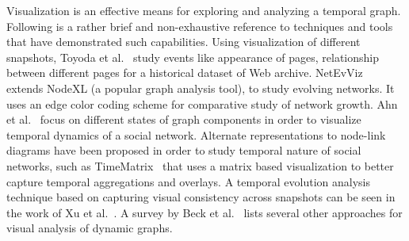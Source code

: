 \documentclass{svjour3}
\begin{document}
Visualization is an effective means for exploring and analyzing a temporal graph. Following is a rather brief and non-exhaustive reference to techniques and tools that have demonstrated such capabilities. 
Using visualization of different snapshots, Toyoda et al.~\cite{toyoda2005system} study events like appearance of pages, relationship between different pages for a historical dataset of Web archive.
NetEvViz~\cite{khurana2011visual} extends NodeXL (a popular graph analysis tool), to study evolving networks. It uses an edge color coding scheme for comparative study of network growth. Ahn et al.~\cite{ahn2011temporal} focus on different states of graph components in order to visualize temporal dynamics of a social network.
Alternate representations to node-link diagrams have been proposed in order to study temporal nature of social networks, such as TimeMatrix~\cite{yi2010timematrix} that uses a matrix based visualization to better capture temporal aggregations and overlays. A temporal evolution analysis technique based on capturing visual consistency across snapshots can be seen in the work of Xu et al.~\cite{xu2011visualizing}.
A survey by Beck et al.~\cite{beck2014state} lists several other approaches for visual analysis of dynamic graphs. 





\end{document}
